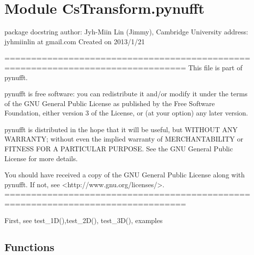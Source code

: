%
%
%


\section{Module CsTransform.pynufft}

    \label{CsTransform:pynufft}
package docstring author: Jyh-Miin Lin  (Jimmy), Cambridge University 
address: jyhmiinlin at gmail.com Created on 2013/1/21

================================================================================
This file is part of pynufft.

pynufft is free software: you can redistribute it and/or modify it under 
the terms of the GNU General Public License as published by the Free 
Software Foundation, either version 3 of the License, or (at your option) 
any later version.

pynufft is distributed in the hope that it will be useful, but WITHOUT ANY 
WARRANTY; without even the implied warranty of MERCHANTABILITY or FITNESS 
FOR A PARTICULAR PURPOSE.  See the GNU General Public License for more 
details.

You should have received a copy of the GNU General Public License along 
with pynufft.  If not, see 
{\textless}http://www.gnu.org/licenses/{\textgreater}. 
================================================================================

First, see test\_1D(),test\_2D(), test\_3D(), examples



  \subsection{Functions}

    \label{CsTransform:pynufft:DFT_slow}

